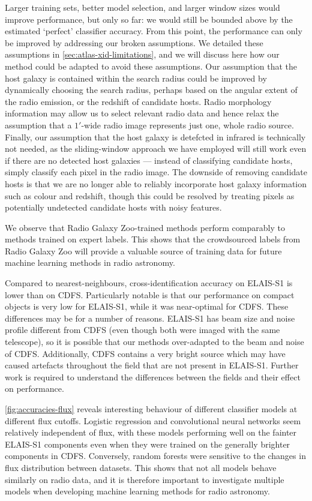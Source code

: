   Larger training sets, better model selection, and larger window sizes would
  improve performance, but only so far: we would still be bounded above by the
  estimated `perfect' classifier accuracy. From this point, the performance
  can only be improved by addressing our broken assumptions. We detailed
  these assumptions in \autoref{sec:atlas-xid-limitations}, and we will discuss here how
  {our method could be adapted to avoid these assumptions}. Our assumption that the host galaxy is contained
  within the search radius could be improved by dynamically choosing the
  search radius, perhaps based on the angular extent of the radio emission, or the
  redshift of candidate hosts. Radio morphology information may allow us to
  select relevant radio data and hence relax the assumption that a $1'$-wide
  radio image represents just one, whole radio source. Finally, our assumption
  that the host galaxy is detefcted in infrared is technically not needed, as
  the sliding-window approach we have employed will still work even if there
  are no detected host galaxies --- instead of classifying candidate hosts,
  simply classify each pixel in the radio image. The downside of removing
  candidate hosts is that we are no longer able to reliably incorporate host
  galaxy information such as colour and redshift, though this could be
  resolved by treating pixels as potentially undetected candidate hosts with
  noisy features.

  We observe that Radio Galaxy Zoo-trained methods perform comparably to
  methods trained on expert labels. This shows that the crowdsourced labels
  from Radio Galaxy Zoo will provide a valuable source of training
  data for future machine learning methods in radio astronomy.

  Compared to nearest-neighbours, cross-identification accuracy on ELAIS-S1 is
  lower than on CDFS. Particularly notable is that our performance on compact
  objects is very low for ELAIS-S1, while it was near-optimal for CDFS. These
  differences may be for a number of reasons. ELAIS-S1 has beam size and noise
  profile different from CDFS (even though both were imaged with the same
  telescope), so it is possible that our methods over-adapted to the beam and
  noise of CDFS. Additionally, CDFS contains a very bright source which may
  have caused artefacts throughout the field that are not present in ELAIS-S1.
  Further work is required to understand the differences between the fields
  and their effect on performance.

  \autoref{fig:accuracies-flux} reveals interesting behaviour of different
  classifier models at different flux cutoffs. Logistic regression and
  convolutional neural networks seem relatively independent of flux, with
  these models performing well on the fainter ELAIS-S1 components even when
  they were trained on the generally brighter components in CDFS. Conversely,
  random forests were sensitive to the changes in flux distribution between
  datasets. This shows that not all models behave similarly on radio data,
  and it is therefore important to investigate multiple models when
  developing machine learning methods for radio astronomy.

